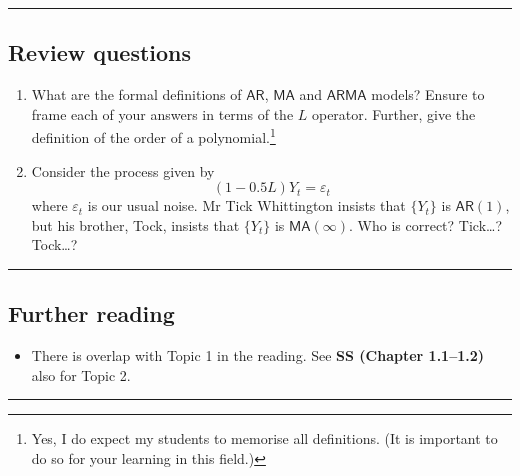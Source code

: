 \documentclass[
  letterpaper,
  DIV=11,
  numbers=noendperiod]{scrartcl}
\providecommand{\tightlist}{%
  \setlength{\itemsep}{0pt}\setlength{\parskip}{0pt}}
\begin{document}
\begin{center}\rule{0.5\linewidth}{0.5pt}\end{center}

\subsection{Review questions}\label{review-questions}

\begin{enumerate}
\def\labelenumi{\arabic{enumi}.}
\item
  What are the formal definitions of \(\mathsf{AR}\), \(\mathsf{MA}\)
  and \(\mathsf{ARMA}\) models? Ensure to frame each of your answers in
  terms of the \(L\) operator. Further, give the definition of the order
  of a polynomial.\footnote{Yes, I do expect my students to memorise all
    definitions. (It is important to do so for your learning in this
    field.)}
\item
  Consider the process given by \[(1 - 0.5L)Y_t = \varepsilon_t\] where
  \(\varepsilon_t\) is our usual noise. Mr Tick Whittington insists that
  \(\{Y_t\}\) is \(\mathsf{AR}(1)\), but his brother, Tock, insists that
  \(\{Y_t\}\) is \(\mathsf{MA}(\infty)\). Who is correct? Tick\ldots?
  Tock\ldots?
\end{enumerate}

\begin{center}\rule{0.5\linewidth}{0.5pt}\end{center}

\subsection{Further reading}\label{further-reading}

\begin{itemize}
\tightlist
\item
  There is overlap with Topic 1 in the reading. See \textbf{SS (Chapter
  1.1--1.2)} also for Topic 2.
\end{itemize}

\begin{center}\rule{0.5\linewidth}{0.5pt}\end{center}
\end{document}
